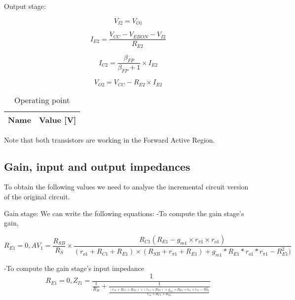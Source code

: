 \quad Output stage:

\begin{equation*}
V_{I2}=V_{O1}
\end{equation*}

\begin{equation*}
I_{E2}=\frac{V_{CC}-V_{EBON}-V_{I2}}{R_{E2}}
\end{equation*}

\begin{equation*}
I_{C2}=\frac{\beta _{FP}}{\beta _{FP}+1} \times I_{E2}
\end{equation*}

\begin{equation*}
V_{O2}=V_{CC}-R_{E2} \times I_{E2}
\end{equation*}

\begin{table}[h]
  \centering
  \begin{tabular}{|l|r|}
    \hline    
    {\bf Name} & {\bf Value [V]} \\ \hline
    
  \end{tabular}
  \caption{Operating point}
  \label{tab:OP}
\end{table}
\FloatBarrier

Note that both transistors are working in the Forward Active Region.


\subsection{Gain, input and output impedances}

To obtain the following values we need to analyse the incremental circuit version of the original circuit.  \par

\quad Gain stage:
We can write the following equations: 
-To compute the gain stage's gain,

\begin{equation} \label{eq5}
R_{E1}=0 , AV_1 = \frac{R_{SB}}{R_S} \times \frac{R_{C1}(R_{E1}-g_{m1}\times r_{\pi 1}\times r_{o1})}{(r_{o1}+R_{C1}+R_{E1})\times(R_{SB}+r_{\pi 1}+R_{E1})+g_{m1}*R_{E1}*r_{o1}*r_{\pi 1} - R_{E1}^2)}
\end{equation}

-To compute the gain stage's input impedance
\begin{equation} \label{eq6}
R_{E1}=0 , Z_{I1} = \frac{1}{\frac{1}{R_B}+\frac{1}{\frac{(r_{o1}+R_{C1}+R_{E1})\times(r_{\pi 1}+R_{E1})+g_{m1}\times R_{E1}\times r_{o1}\times r_{\pi 1} - R_{E1}^2}{r_{o1}+R_{C1}+R_{E1}}}}
\end{equation}

